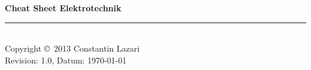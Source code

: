 \documentclass[10pt,landscape]{scrartcl}
\begin{document}
	\raggedright
	\footnotesize
	\begin{multicols}{3}


	\setlength{\premulticols}{1pt}
	\setlength{\postmulticols}{1pt}
	\setlength{\multicolsep}{1pt}
	\setlength{\columnsep}{2pt}
	\newlength{\MyLenA}
	\newlength{\MyLenB}

	\begin{center}
	\large{\textbf{Cheat Sheet Elektrotechnik}} \\
	\end{center}

	


	\rule{0.3\linewidth}{0.25pt}\\
	\scriptsize
	Copyright \copyright\ 2013 Constantin Lazari\\
	Revision: 1.0, Datum: \today\\
	\end{multicols}
\end{document}
